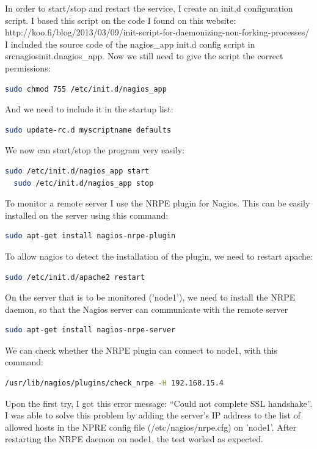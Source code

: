 \documentclass[12pt]{report}
\begin{document}
In order to start/stop and restart the service, I create an init.d
configuration script.
I based this script on the code I found on this website: 
http://koo.fi/blog/2013/03/09/init-script-for-daemonizing-non-forking-processes/
I included the source code of the nagios\_app init.d config script in src\/nagios\/init.d\/nagios\_app.
Now we still need to give the script the correct permissions:
\begin{lstlisting}[language=bash]
  sudo chmod 755 /etc/init.d/nagios_app
\end{lstlisting} 
And we need to include it in the startup list:
\begin{lstlisting}[language=bash]
  sudo update-rc.d myscriptname defaults
\end{lstlisting}

We now can start/stop the program very easily:
\begin{lstlisting}[language=bash]
  sudo /etc/init.d/nagios_app start
  sudo /etc/init.d/nagios_app stop
\end{lstlisting}

To monitor a remote server I use the NRPE plugin for Nagios. 
This can be easily installed on the server using this command:
\begin{lstlisting}[language=bash]
  sudo apt-get install nagios-nrpe-plugin
\end{lstlisting} 

To allow nagios to detect the installation of the plugin, we need to
restart apache:
\begin{lstlisting}[language=bash]
  sudo /etc/init.d/apache2 restart
\end{lstlisting} 

On the server that is to be monitored ('node1'), we need to install the NRPE
daemon, so that the Nagios server can communicate with the remote
server
\begin{lstlisting}[language=bash]
  sudo apt-get install nagios-nrpe-server
\end{lstlisting} 

We can check whether the NRPE plugin can connect to node1, with this command:
\begin{lstlisting}[language=bash]
  /usr/lib/nagios/plugins/check_nrpe -H 192.168.15.4
\end{lstlisting} 
Upon the first try, I got this error message: ``Could not complete SSL
handshake''.
I was able to solve this problem by adding the server's IP address to
the list of allowed hosts in the NPRE config file
(/etc/nagios/nrpe.cfg) on 'node1'.
After restarting the NRPE daemon on node1, the test worked as
expected.
\end{document}
